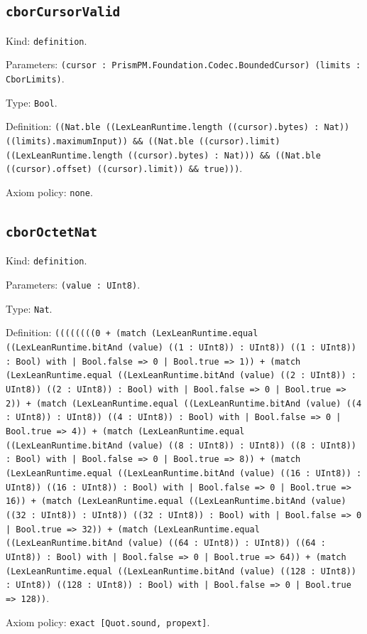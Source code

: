 \documentclass[11pt]{article}
\begin{document}
\subsection*{\texttt{cborCursorValid}}
\noindent Kind: \texttt{definition}.\par
\noindent Parameters: \texttt{(cursor : PrismPM.Foundation.Codec.BoundedCursor) (limits : CborLimits)}.\par
\noindent Type: \texttt{Bool}.\par
\noindent Definition: \texttt{((Nat.ble ((LexLeanRuntime.length ((cursor).bytes) : Nat)) ((limits).maximumInput)) \&\& ((Nat.ble ((cursor).limit) ((LexLeanRuntime.length ((cursor).bytes) : Nat))) \&\& ((Nat.ble ((cursor).offset) ((cursor).limit)) \&\& true)))}.\par
\noindent Axiom policy: \texttt{none}.\par
\subsection*{\texttt{cborOctetNat}}
\noindent Kind: \texttt{definition}.\par
\noindent Parameters: \texttt{(value : UInt8)}.\par
\noindent Type: \texttt{Nat}.\par
\noindent Definition: \texttt{((((((((0 + (match (LexLeanRuntime.equal ((LexLeanRuntime.bitAnd (value) ((1 : UInt8)) : UInt8)) ((1 : UInt8)) : Bool) with | Bool.false => 0 | Bool.true => 1)) + (match (LexLeanRuntime.equal ((LexLeanRuntime.bitAnd (value) ((2 : UInt8)) : UInt8)) ((2 : UInt8)) : Bool) with | Bool.false => 0 | Bool.true => 2)) + (match (LexLeanRuntime.equal ((LexLeanRuntime.bitAnd (value) ((4 : UInt8)) : UInt8)) ((4 : UInt8)) : Bool) with | Bool.false => 0 | Bool.true => 4)) + (match (LexLeanRuntime.equal ((LexLeanRuntime.bitAnd (value) ((8 : UInt8)) : UInt8)) ((8 : UInt8)) : Bool) with | Bool.false => 0 | Bool.true => 8)) + (match (LexLeanRuntime.equal ((LexLeanRuntime.bitAnd (value) ((16 : UInt8)) : UInt8)) ((16 : UInt8)) : Bool) with | Bool.false => 0 | Bool.true => 16)) + (match (LexLeanRuntime.equal ((LexLeanRuntime.bitAnd (value) ((32 : UInt8)) : UInt8)) ((32 : UInt8)) : Bool) with | Bool.false => 0 | Bool.true => 32)) + (match (LexLeanRuntime.equal ((LexLeanRuntime.bitAnd (value) ((64 : UInt8)) : UInt8)) ((64 : UInt8)) : Bool) with | Bool.false => 0 | Bool.true => 64)) + (match (LexLeanRuntime.equal ((LexLeanRuntime.bitAnd (value) ((128 : UInt8)) : UInt8)) ((128 : UInt8)) : Bool) with | Bool.false => 0 | Bool.true => 128))}.\par
\noindent Axiom policy: \texttt{exact [Quot.sound, propext]}.\par
\end{document}
